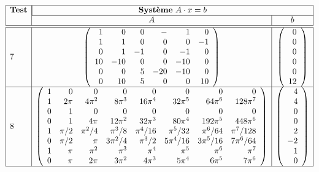 $$\begin{array}{|l|c|c|}
\hline
\mbox{\bf Test} & \multicolumn{2}{|c|}{\mbox{{\bf Système} $A\cdot x = b$}}\\
\cline{2-3}
                & A & b  \\
\hline
\hline
7 &
\left(\begin{array}{rrrrrr}
1 & 0 & 0 & - & 1 & 0\\
1 & 1 & 0 & 0 & 0 & -1\\
0 & 1 & -1 & 0 & -1 & 0\\
10 & -10 & 0 & 0 & -10 & 0\\
0 & 0 & 5 & -20 & -10 & 0\\
0 & 10 & 5 & 0 & 0 & 10
\end{array}\right) 
&
\left(\begin{array}{r}
0 \\ 0 \\ 0 \\ 0 \\ 0 \\ 12
\end{array}\right)\\
\hline
8 &
\left(\begin{array}{rrrrrrrr}
1 & 0 & 0 & 0 & 0 & 0 & 0 & 0\\
1 & 2\pi & 4\pi^2 & 8\pi^3 & 16\pi^4 & 32\pi^5 & 64\pi^6 & 128\pi^7\\
0 & 1 & 0 & 0 & 0 & 0 & 0 & 0\\
0 & 1 & 4\pi & 12\pi^2 & 32\pi^3 & 80\pi^4 & 192\pi^5 & 448\pi^6\\
1 & \pi/2 & \pi^2/4 & \pi^3/8 & \pi^4/16 & \pi^5/32 & \pi^6/64 & \pi^7/128\\
0 & \pi/2 & \pi & 3\pi^2/4 & \pi^3/2 & 5\pi^4/16 & 3\pi^5/16 & 7\pi^6/64\\
1 & \pi & \pi^2 & \pi^3 & \pi^4 & \pi^5 & \pi^6 & \pi^7\\
0 & \pi & 2\pi & 3\pi^2 & 4\pi^3 & 5\pi^4 & 6\pi^5 & 7\pi^6
\end{array}\right) 
&
\left(\begin{array}{r}
4 \\ 4 \\ 0 \\ 0 \\ 2 \\ -2 \\ 1 \\ 0
\end{array}\right)\\
\hline
\end{array}$$

